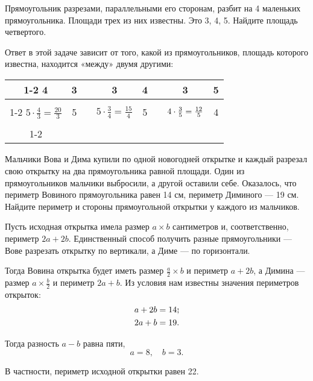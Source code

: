 \begin{itemize}

\itA Прямоугольник разрезами, параллельными его сторонам, разбит на 4 маленьких прямоугольника. Площади трех из них известны. Это 3, 4, 5. Найдите площадь четвертого.

\itr Ответ в этой задаче зависит от того, какой из прямоугольников, площадь которого известна, находится «между» двумя другими:

\def\lins{\cline{1-2} \cline{4-5} \cline{7-8}}
\begin{center} \begin{tabular}{|c|c|c|c|c|c|c|c|}
	\lins
	4 & 3 & \hspace{0.8cm} & 3 & 4 & \hspace{0.8cm} & 3 & 5 \\ \lins
	$5 \cdot \tfrac{4}{3} = \tfrac{20}{3}$ & 5 & &
	$5 \cdot \tfrac{3}{4} = \tfrac{15}{4}$ & 5 & &
	$4 \cdot \tfrac{3}{5} = \vphantom{\int\limits_0^0}
		\tfrac{12}{5}$ & 4 \\ \lins
\end{tabular} \end{center}

\itB Мальчики Вова и Дима купили по одной новогодней открытке и каждый разрезал свою открытку на два прямоугольника равной площади. Один из прямоугольников мальчики выбросили, а другой оставили себе. Оказалось, что периметр Вовиного прямоугольника равен 14 см, периметр Диминого — 19 см. Найдите периметр и стороны прямоугольной открытки у каждого из мальчиков.

\itr Пусть исходная открытка имела размер $a \times b$ сантиметров и, соответственно, периметр $2a+2b$. Единственный способ получить разные прямоугольники — Вове разрезать открытку по вертикали, а Диме — по горизонтали.

Тогда Вовина открытка будет иметь размер $\tfrac{a}{2} \times b$ и периметр $a+2b$, а Димина — размер $a \times \tfrac{b}{2}$ и периметр $2a+b$. Из условия нам известны значения периметров открыток:
\begin{align*}
	a+2b = 14\scolon \\
	2a+b = 19.
\end{align*}

Тогда разность $a-b$ равна пяти,
	$$a=8,\quad b=3.$$
	
В частности, периметр исходной открытки равен \SI{22}{}.

\end{itemize}



